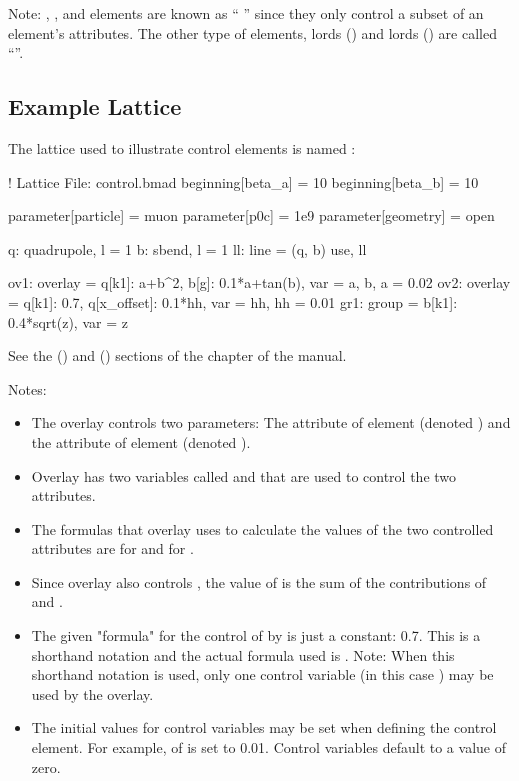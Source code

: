 \documentclass{hitec}     %
\begin{document}
{Note: , , and  elements are known as `` '' since they
only control a subset of an element's attributes. The other type of  elements,  lords
() and  lords () are called ``''.

\subsection{Example Lattice}

The lattice used to illustrate control elements is named :
\begin{code}
! Lattice File: control.bmad
beginning[beta_a] = 10
beginning[beta_b] = 10

parameter[particle] = muon
parameter[p0c] = 1e9
parameter[geometry] = open

q: quadrupole, l = 1
b: sbend, l = 1
ll: line = (q, b)
use, ll

ov1: overlay = {q[k1]: a+b^2, b[g]: 0.1*a+tan(b)}, var = {a, b}, a = 0.02
ov2: overlay = {q[k1]: 0.7, q[x_offset]: 0.1*hh}, var = {hh}, hh = 0.01
gr1: group = {b[k1]: 0.4*sqrt(z)}, var = {z}
\end{code}
See the  () and  () sections of the
 chapter of the \bmad manual.

Notes:
\vspace{-5 pt}
\begin{itemize}
\item
The overlay  controls two parameters: 
The  attribute of element  (denoted ) and the  attribute of element
 (denoted ).
\item
Overlay  has two variables called  and  that are used to control the two attributes.
\item
The formulas that overlay  uses to calculate the values of the two controlled
attributes are  for  and  for .
\item 
Since overlay  also controls , the value of  is the sum of the
contributions of  and .
\item
The given "formula" for the control of  by  is just a constant: 0.7.  This is a
shorthand notation and the actual formula used is .  Note: When this shorthand notation
is used, only one control variable (in this case ) may be used by the overlay.
\item
The initial values for control variables may be set when defining the control element. For example,
 of  is set to 0.01. Control variables default to a value of zero.
\end{itemize}

}
\end{document}
